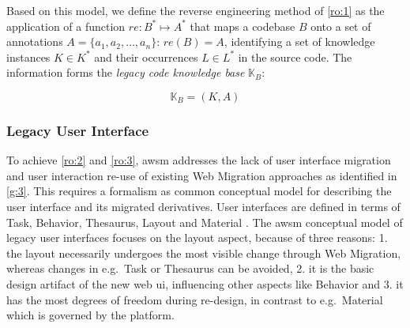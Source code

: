 Based on this model, we define the reverse engineering method of \cref{ro:1} as the application of a function \(re: B^* \mapsto A^*\) that maps a  codebase \(B\) onto a set of annotations \(A = \{a_1,a_2,\ldots,a_n\}\): \(re(B) = A\), identifying a set of knowledge instances \(K\in K^*\) and their occurrences \(L \in L^*\) in the source code.
The information forms the \emph{legacy code knowledge base} \(\mathbb{K}_{B}\):

\begin{equation}\mathbb{K}_{B} = (K, A)\label{eq:knowledgebase}\end{equation}


\hypertarget{sec:ui-formalism}{%
\subsubsection*{Legacy User Interface}\label{sec:ui-formalism}}
To achieve \cref{ro:2} and \cref{ro:3}, \gls{awsm} addresses the lack of user interface migration and user interaction re-use of existing \gls{Web Migration} approaches as identified in \cref{g:3}.
This requires a formalism as common conceptual model for describing the  user interface and its migrated derivatives.
User interfaces are defined in terms of Task, Behavior, Thesaurus, Layout and Material \autocite{Bakaev2017Kansei}.
The \gls{awsm} conceptual model of legacy user interfaces focuses on the layout aspect, because of three reasons: 1. the layout necessarily undergoes the most visible change through \gls{Web Migration}, whereas changes in e.g.~Task or Thesaurus can be avoided, 2. it is the basic design \gls{artifact} of the new \gls{web} \gls{ui}, influencing other aspects like Behavior and 3. it has the most degrees of freedom during re-design, in contrast to e.g.~Material which is governed by the platform.

